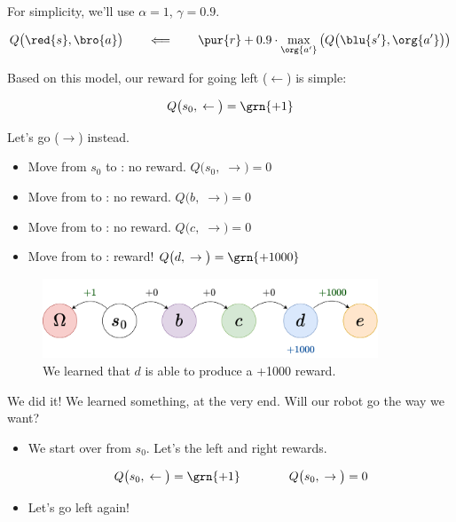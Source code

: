         For simplicity, we'll use $\alpha=1$, $\gamma=0.9$.

        \begin{equation}
            Q\big(\red{s},\bro{a} \big) 
            \qquad\Longleftarrow\qquad 
                \pur{r}
                +
                0.9 \cdot
                \max_{\org{a'}} 
                    \big( Q\big(\blu{s'},\org{a'} \big) \big) 
        \end{equation}

        Based on this model, our reward for going left ($\leftarrow$) is simple:

        \begin{equation}
            Q\big(s_0,\; \leftarrow\big)=\grn{+1}
        \end{equation}

        Let's go  ($\rightarrow$) instead.

        \begin{itemize}
            \item Move from $s_0$ to : no reward. $Q\big(s_0,\; \rightarrow\big)=0$
            \item Move from  to : no reward. $Q\big(b,\; \rightarrow\big)=0$
            \item Move from  to : no reward. $Q\big(c,\; \rightarrow\big)=0$
            \item Move from  to : reward! $Q\big(d,\; \rightarrow\big)=\grn{+1000}$
        \end{itemize}

        \begin{figure}[H]
            \centering
            \includegraphics[width=100mm,scale=0.5]{images/rl_images/hallway_d.png}
            \caption*{We learned that $d$ is able to produce a +1000 reward.}
        \end{figure}

        We did it! We learned something, at the very end. Will our robot go the way we want?

        \begin{itemize}
            \item We start over from $s_0$. Let's  the left and right rewards.

            \begin{equation}
                Q\big(s_0,\; \leftarrow\big)=\grn{+1} \qquad \qquad Q\big(s_0,\; \rightarrow\big)=0
            \end{equation}

            \item Let's go left again!
        \end{itemize}

